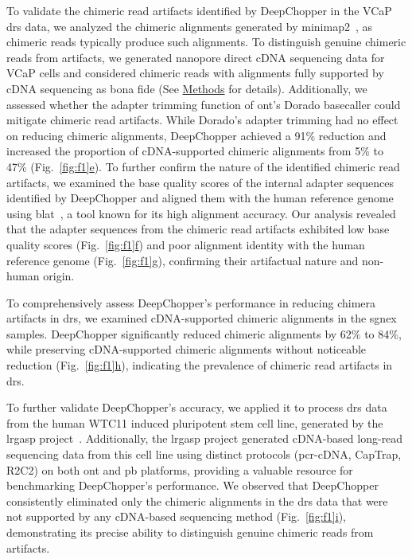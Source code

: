 \documentclass[pdflatex,sn-nature, lineno]{sn-jnl}%
\newcommand{\figref}[2]{Fig.~\hyperref[#1]{\ref*{#1}#2}}
\begin{document}
To validate the chimeric read artifacts identified by DeepChopper in the VCaP \gls{drs} data, we analyzed the chimeric alignments generated by minimap2~\cite{li2018minimap2}, as chimeric reads typically produce such alignments.
To distinguish genuine chimeric reads from artifacts, we generated nanopore direct cDNA sequencing data for VCaP cells and considered chimeric reads with alignments fully supported by cDNA sequencing as bona fide (See \hyperref[sec:methods]{Methods} for details).
Additionally, we assessed whether the adapter trimming function of \gls{ont}'s Dorado basecaller could mitigate chimeric read artifacts.
While Dorado's adapter trimming had no effect on reducing chimeric alignments, DeepChopper achieved a 91\% reduction and increased the proportion of cDNA-supported chimeric alignments from 5\% to 47\% (\figref{fig:f1}{e}).
To further confirm the nature of the identified chimeric read artifacts, we examined the base quality scores of the internal adapter sequences identified by DeepChopper and aligned them with the human reference genome using \gls{blat}~\cite{kent2002blat}, a tool known for its high alignment accuracy.
Our analysis revealed that the adapter sequences from the chimeric read artifacts exhibited low base quality scores (\figref{fig:f1}{f}) and poor alignment identity with the human reference genome (\figref{fig:f1}{g}), confirming their artifactual nature and non-human origin.

To comprehensively assess DeepChopper’s performance in reducing chimera artifacts in \gls{drs}, we examined cDNA-supported chimeric alignments in the \gls{sgnex} samples.
DeepChopper significantly reduced chimeric alignments by 62\% to 84\%, while preserving cDNA-supported chimeric alignments without noticeable reduction (\figref{fig:f1}{h}), indicating the prevalence of chimeric read artifacts in \gls{drs}.

To further validate DeepChopper's accuracy, we applied it to process \gls{drs} data from the human WTC11 induced pluripotent stem cell line, generated by the \gls{lrgasp} project~\cite{pardo2024systematic}.
Additionally, the \gls{lrgasp} project generated cDNA-based long-read sequencing data from this cell line using distinct protocols (\gls{pcr}-cDNA, CapTrap, R2C2) on both \gls{ont} and \gls{pb} platforms, providing a valuable resource for benchmarking DeepChopper's performance.
We observed that DeepChopper consistently eliminated only the chimeric alignments in the \gls{drs} data that were not supported by any cDNA-based sequencing method (\figref{fig:f1}{i}), demonstrating its precise ability to distinguish genuine chimeric reads from artifacts.
\end{document}

